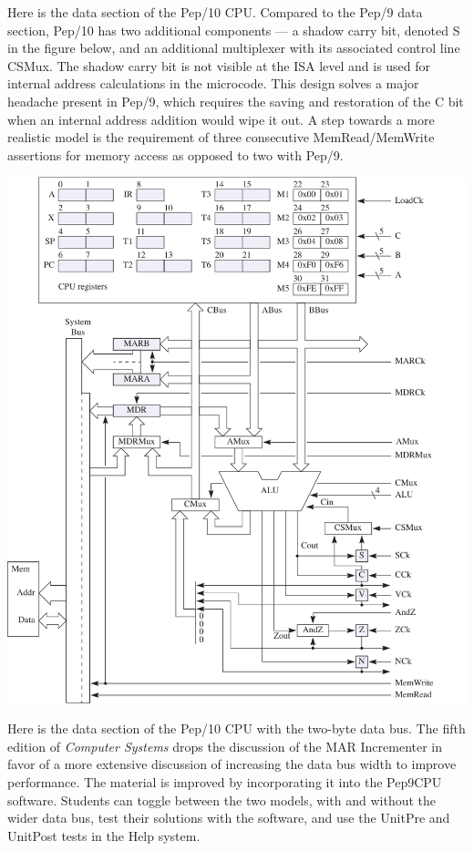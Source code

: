 \documentclass[10pt,fleqn]{book}
\begin{document}
\newpage

\noindent Here is the data section of the Pep/10 CPU.
Compared to the Pep/9 data section, Pep/10 has two additional components --- a shadow carry bit, denoted S in the figure below, and an additional multiplexer with its associated control line CSMux.
The shadow carry bit is not visible at the ISA level and is used for internal address calculations in the microcode.
This design solves a major headache present in Pep/9, which requires the saving and restoration of the C bit when an internal address addition would wipe it out.
A step towards a more realistic model is the requirement of three consecutive MemRead/MemWrite assertions for memory access as opposed to two with Pep/9.\\
\begin{center}
\includegraphics{pep9cpu.pdf}
\end{center}

\newpage

\noindent Here is the data section of the Pep/10 CPU with the two-byte data bus.
The fifth edition of \textit{Computer Systems} drops the discussion of the MAR Incrementer in favor of a more extensive discussion of increasing the data bus width to improve performance.
The material is improved by incorporating it into the Pep9CPU software.
Students can toggle between the two models, with and without the wider data bus, test their solutions with the software, and use the UnitPre and UnitPost tests in the Help system.
\end{document}
